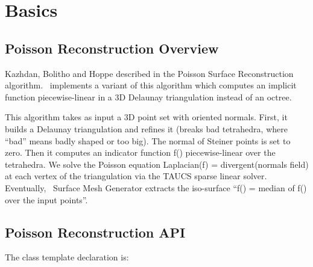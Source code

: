 \section{Basics}


\subsection{Poisson Reconstruction Overview}

Kazhdan, Bolitho and Hoppe described in \cite{Kazhdan06}
the Poisson Surface Reconstruction algorithm.
\cgal\ implements a variant of this algorithm which computes an implicit function
piecewise-linear in a 3D Delaunay triangulation instead of an octree.

This algorithm takes as input a 3D point set with oriented normals.
First, it builds a Delaunay triangulation and refines it (breaks bad tetrahedra, where {}``bad'' means
badly shaped or too big). The normal of Steiner points is set to zero.
Then it computes an indicator function f() piecewise-linear over the tetrahedra.
We solve the Poisson equation Laplacian(f) = divergent(normals field)
at each vertex of the triangulation via the TAUCS sparse linear solver.
Eventually, \cgal\ Surface Mesh Generator extracts the iso-surface {}``f() = median
of f() over the input points''.



\subsection{Poisson Reconstruction API}

The class template declaration is:

